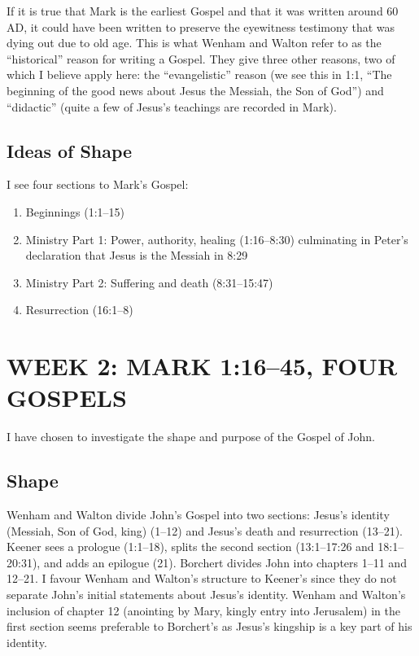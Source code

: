 If it is true that Mark is the earliest Gospel and that it was written around 60
AD, it could have been written to preserve the eyewitness testimony that was
dying out due to old age. This is what Wenham and Walton refer to as the
\enquote{historical} reason for writing a
Gospel.\autocite[54-56]{wenham+walton:2011} They give three other reasons, two
of which I believe apply here: the \enquote{evangelistic} reason (we see this in
1:1, \enquote{The beginning of the good news about Jesus the Messiah, the Son of
God}) and \enquote{didactic} (quite a few of Jesus's teachings are recorded in
Mark).

\subsection{Ideas of Shape}

I see four sections to Mark's Gospel:

\singlespacing
\begin{enumerate}
    \item Beginnings (1:1--15)
    \item Ministry Part 1: Power, authority, healing (1:16--8:30) culminating in
        Peter's declaration that Jesus is the Messiah in 8:29
    \item Ministry Part 2: Suffering and death (8:31--15:47)
    \item Resurrection (16:1--8)
\end{enumerate}
\doublespacing


\section{WEEK 2: MARK 1:16--45, FOUR GOSPELS}

I have chosen to investigate the shape and purpose of the Gospel of John.

\subsection{Shape}

Wenham and Walton divide John's Gospel into two sections: Jesus's identity
(Messiah, Son of God, king) (1--12) and Jesus's death and resurrection
(13--21).\autocite[237]{wenham+walton:2011} Keener sees a prologue (1:1--18),
splits the second section (13:1--17:26 and 18:1--20:31), and adds an epilogue
(21).\autocite[420]{keener:2013} Borchert divides John into chapters 1--11 and
12--21.\autocites{borchert:1996}{borchert:2002} I favour Wenham and Walton's
structure to Keener's since they do not separate John's initial statements about
Jesus's identity. Wenham and Walton's inclusion of chapter 12 (anointing by
Mary, kingly entry into Jerusalem) in the first section seems preferable to
Borchert's as Jesus's kingship is a key part of his identity.

